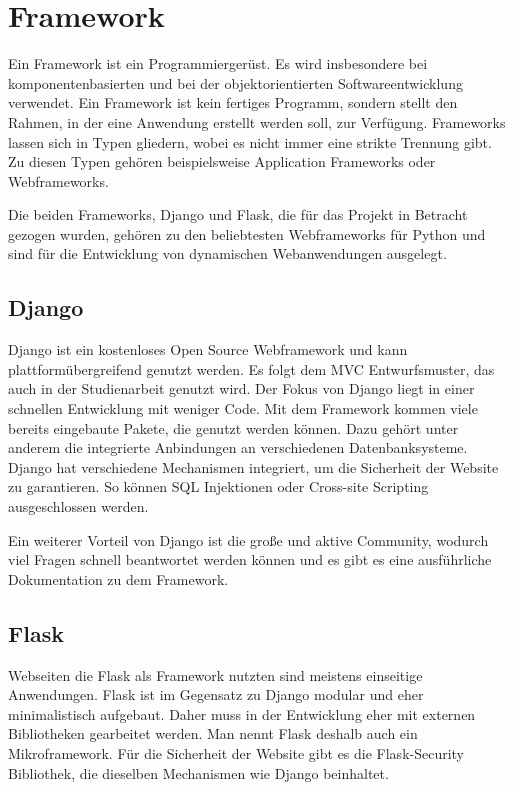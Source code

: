 \section{Framework}
Ein Framework ist ein Programmiergerüst. Es wird insbesondere bei komponentenbasierten und bei der objektorientierten Softwareentwicklung verwendet. Ein Framework ist kein fertiges Programm, sondern stellt den Rahmen, in der eine Anwendung erstellt werden soll, zur Verfügung. Frameworks lassen sich in Typen gliedern, wobei es nicht immer eine strikte Trennung gibt. Zu diesen Typen gehören beispielsweise  Application Frameworks oder Webframeworks.

Die beiden Frameworks, Django und Flask, die für das Projekt in Betracht gezogen wurden, gehören zu den beliebtesten Webframeworks für Python und sind für die Entwicklung von dynamischen Webanwendungen ausgelegt. 

\subsection{Django}
Django ist ein kostenloses Open Source Webframework und kann plattformübergreifend genutzt werden. Es folgt dem \ac{MVC} Entwurfsmuster, das auch in der Studienarbeit genutzt wird. Der Fokus von Django liegt in einer schnellen Entwicklung mit weniger Code. Mit dem Framework kommen viele bereits eingebaute Pakete, die genutzt werden können. Dazu gehört unter anderem die integrierte Anbindungen an verschiedenen Datenbanksysteme. Django hat verschiedene Mechanismen integriert, um die Sicherheit der Website zu garantieren. So können SQL Injektionen oder Cross-site Scripting ausgeschlossen werden.

Ein weiterer Vorteil von Django ist die große und aktive Community, wodurch viel Fragen schnell beantwortet werden können und es gibt es eine ausführliche Dokumentation zu dem Framework. 

\subsection{Flask}
Webseiten die Flask als Framework nutzten sind meistens einseitige Anwendungen. Flask ist im Gegensatz zu Django modular und eher minimalistisch aufgebaut. Daher muss in der Entwicklung eher mit externen Bibliotheken gearbeitet werden. Man nennt Flask deshalb auch ein Mikroframework. Für die Sicherheit der Website gibt es die Flask-Security Bibliothek, die dieselben Mechanismen wie Django beinhaltet.

